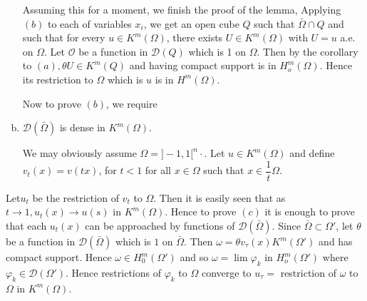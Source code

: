 \begin{enumerate}[(a)]
  Assuming this for a moment, we finish the proof of the lemma, Applying
  $(b)$ to each of variables $x_i$, we get an open cube $Q$ such that
  $\bar{\Omega} \cap Q$ and such that for every $ u \in
  K^m (\Omega)$, there exists $ U \in K^m
  (\Omega)$ with $U=u$ a.e. on $\Omega$. Let $\mathscr{O}$ be a function
  in $\mathscr{D}(Q)$ which is 1 on $\Omega$. Then by the corollary
  to $(a), \theta U \in K^m (Q)$ and having compact
  support is in $H^m_o (\Omega)$. Hence its restriction to $\Omega$
  which is $u$ is in $H^m(\Omega)$.  

  Now to prove $(b)$, we require 
\item $\mathscr{D}(\bar{\Omega})$ is dense in $K^m (\Omega)$. 
  
  We may obviously assume $\Omega=]-1, 1[^n \cdot$. Let $u \in
      K^m (\Omega)$ and define $v_t(x) = v(tx)$, for $t< 1$ for all $x
      \in \Omega$ such that $x \in \dfrac{1}{t} \Omega$.  
\end{enumerate}

Let\pageoriginale $u_t$ be the restriction of $v_t$ to $\Omega$. Then it is
easily seen that as $t \to 1, u_t (x) \to u(s)$ in $K^m
(\Omega)$. Hence to prove $(c)$ it is enough to prove that each
$u_t (x)$ can be approached by functions of $\mathscr{D}
(\bar{\Omega })$. Since $\bar{\Omega} \subset \Omega '$, let $\theta$
be a function in $\mathscr{D} (\bar{\Omega})$ which is $1$ on
$\bar{\Omega}$. Then $\omega = \theta v_\tau (x) K^m
(\Omega')$ and has compact support. Hence $\omega \in H_0^m
(\Omega ')$ and so $\omega = \lim \varphi_k$ in $H_o^m (\Omega ')$
where $\varphi_k \in \mathscr{D} (\Omega ')$. Hence
restrictions of $\varphi_k $ to $\Omega$ converge to $u_\tau = $
restriction of $\omega$ to $\Omega$ in $K^m (\Omega)$.  

